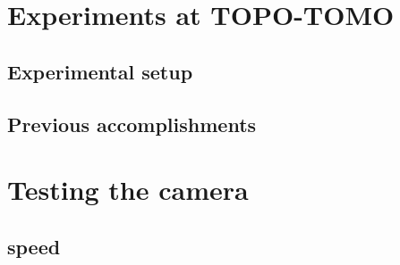 \section{Experiments at TOPO-TOMO}
\subsection{Experimental setup}
\subsection{Previous accomplishments}

\section{Testing the camera}
\subsection{speed}
